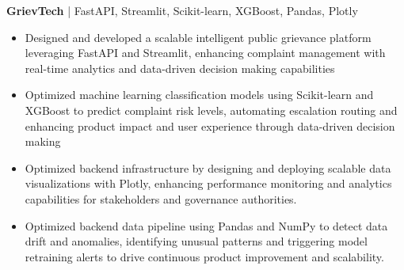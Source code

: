 \textbf{GrievTech} | FastAPI, Streamlit, Scikit-learn, XGBoost, Pandas, Plotly \\
\vspace{-9pt}
\begin{itemize}
  \item Designed and developed a scalable intelligent public grievance platform leveraging FastAPI and Streamlit, enhancing complaint management with real-time analytics and data-driven decision making capabilities
  \item Optimized machine learning classification models using Scikit-learn and XGBoost to predict complaint risk levels, automating escalation routing and enhancing product impact and user experience through data-driven decision making
  \item Optimized backend infrastructure by designing and deploying scalable data visualizations with Plotly, enhancing performance monitoring and analytics capabilities for stakeholders and governance authorities.
  \item Optimized backend data pipeline using Pandas and NumPy to detect data drift and anomalies, identifying unusual patterns and triggering model retraining alerts to drive continuous product improvement and scalability.
\end{itemize}

\vspace{-18.5pt}